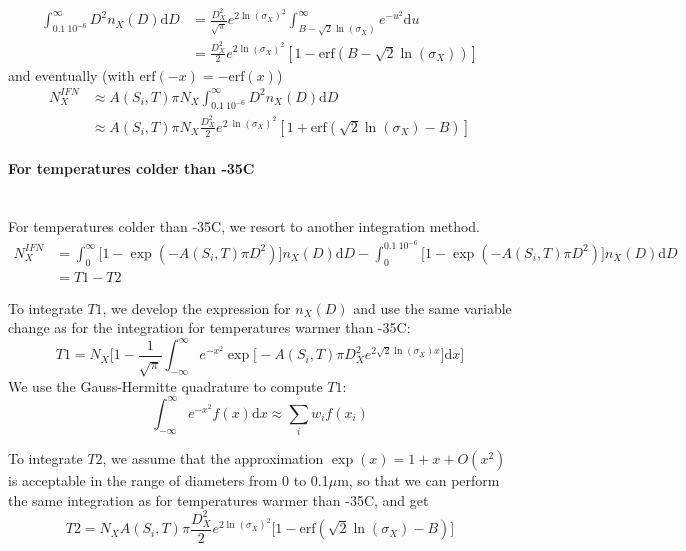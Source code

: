 \begin{align}
 \int_{0.1~10^{-6}}^{\infty} D^2 n_X(D) \mathrm{d}D &= \frac{D_X^2}{\sqrt{\pi}} e^{2 \ln(\sigma_X)^2} \int_{B-\sqrt2 \ln(\sigma_X)}^{\infty} e^{-u^2} \mathrm{d}u \\
 &= \frac{D_X^2}{2} e^{2 \ln(\sigma_X)^2} \left[ 1-\mathrm{erf}(B-\sqrt2 \ln(\sigma_X)) \right]
\end{align}
and eventually (with $\mathrm{erf}(-x) = - \mathrm{erf}(x)$)
\begin{align}
 N_X^{IFN} &\approx A(S_i,T) \pi N_X \int_{0.1~10^{-6}}^{\infty} D^2 n_X(D) \mathrm{d}D \\
 &\approx A(S_i,T) \pi N_X \frac{D_X^2}{2} e^{2 ~ \ln(\sigma_X)^2} \left[ 1 + \mathrm{erf}(\sqrt2 \ln(\sigma_X) - B) \right]
\end{align}

\paragraph{For temperatures colder than -35\textdegree C}
~\\
For temperatures colder than -35\textdegree C, we resort to another integration method.
\begin{align}
 N_X^{IFN} &= \int_{0}^\infty \big[ 1 - \exp(- A(S_i,T) \pi D^2) \big] n_X(D) \mathrm{d}D - \int_{0}^{0.1~10^{-6}} \big[ 1 - \exp(- A(S_i,T) \pi D^2) \big] n_X(D) \mathrm{d}D \\
 &= T1 - T2 
\end{align}

To integrate $T1$, we develop the expression for $n_X(D)$ and use the same variable change as for the integration for temperatures warmer than -35\textdegree C:
\begin{equation}
 T1 = N_X \bigg[ 1 - \frac{1}{\sqrt \pi} \int_{-\infty}^\infty e^{-x^2} \exp\big[ - A(S_i,T) \pi D_X^2 e^{2\sqrt{2}\ln(\sigma_X)x} \big] \mathrm{d}x \bigg]
\end{equation}
We use the Gauss-Hermitte quadrature to compute $T1$:
\begin{equation}
 \int_{-\infty}^\infty e^{-x^2} f(x)\mathrm{d}x \approx \sum_i w_i f(x_i)
\end{equation}

To integrate $T2$, we assume that the approximation $\exp(x)=1+x+O(x^2)$ is acceptable in the range of diameters from 0 to 0.1$\mu$m, so that we can perform the same integration as for temperatures warmer than -35\textdegree C, and get
\begin{equation}
 T2 = N_X A(S_i,T) \pi \frac{D_X^2}{2} e^{2 \ln(\sigma_X)^2} \bigg[ 1 - \mathrm{erf}(\sqrt{2} \ln(\sigma_X) - B) \bigg]
\end{equation}

